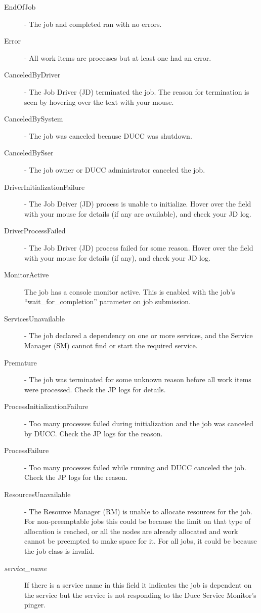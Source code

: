 \begin{description}
              \begin{description}
                  \item[EndOfJob] - The job and completed ran with no errors. 
                  \item[Error] - All work items are processes but at least one had an error. 
                  \item[CanceledByDriver] - The Job Driver (JD) terminated the job. The reason for
                    termination is seen by hovering over the text with your mouse.
                  \item[CanceledBySystem] - The job was canceled because DUCC was shutdown. 
                  \item[CanceledBySser] - The job owner or DUCC administrator canceled the job. 
                  \item[DriverInitializationFailure] - The Job Deiver (JD) process is unable to initialize. Hover over 
                    the field with your mouse for details (if any are available), and check your JD log. 
                  \item[DriverProcessFailed] - The Job Driver (JD) process failed for some reason. Hover over the 
                    field with your mouse for details (if any), and check your JD log. 
                  \item[MonitorActive] The job has a console monitor active.  This is enabled with the
                    job's ``wait\_for\_completion'' parameter on job submission.
                  \item[ServicesUnavailable] - The job declared a dependency on one or more services, and the 
                    Service Manager (SM) cannot find or start the required service. 
                  \item[Premature] - The job was terminated for some unknown reason before all work items were 
                    processed. Check the JP logs for details. 
                  \item[ProcessInitializationFailure] - Too many processes failed during
                    initialization and the job was canceled by DUCC.  Check the JP logs for the
                    reason.
                  \item[ProcessFailure] - Too many processes failed while running and DUCC canceled
                    the job.  Check the JP logs for the reason.
                  \item[ResourcesUnavailable] - The Resource Manager (RM) is unable to allocate resources for 
                    the job. For non-preemptable jobs this could be because the limit on that type of allocation is 
                    reached, or all the nodes are already allocated and work cannot be preempted to make space for 
                    it. For all jobs, it could be because the job class is invalid. 
                    \item[{\em service_name}] If there is a service name in this field it indicates the job is
                      dependent on the service but the service is not responding to the Ducc Service Monitor's
                      pinger.
              \end{description}


\end{description}
